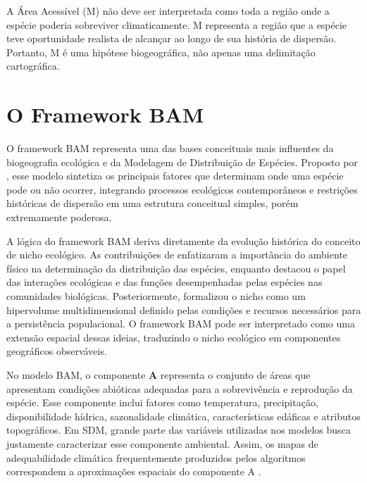 \begin{importantbox}
	A Área Acessível (M) não deve ser interpretada como toda a região onde a espécie poderia sobreviver climaticamente. M representa a região que a espécie teve oportunidade realista de alcançar ao longo de sua história de dispersão. Portanto, M é uma hipótese biogeográfica, não apenas uma delimitação cartográfica.
\end{importantbox}

\section{O Framework BAM}

O framework BAM representa uma das bases conceituais mais influentes da biogeografia ecológica e da Modelagem de Distribuição de Espécies. Proposto por \textcite{Soberon2007}, esse modelo sintetiza os principais fatores que determinam onde uma espécie pode ou não ocorrer, integrando processos ecológicos contemporâneos e restrições históricas de dispersão em uma estrutura conceitual simples, porém extremamente poderosa.

A lógica do framework BAM deriva diretamente da evolução histórica do conceito de nicho ecológico. As contribuições de \textcite{Grinnell1917} enfatizaram a importância do ambiente físico na determinação da distribuição das espécies, enquanto \textcite{Elton1927} destacou o papel das interações ecológicas e das funções desempenhadas pelas espécies nas comunidades biológicas. Posteriormente, \textcite{Hutchinson1957} formalizou o nicho como um hipervolume multidimensional definido pelas condições e recursos necessários para a persistência populacional. O framework BAM pode ser interpretado como uma extensão espacial dessas ideias, traduzindo o nicho ecológico em componentes geográficos observáveis.

No modelo BAM, o componente \textbf{A} representa o conjunto de áreas que apresentam condições abióticas adequadas para a sobrevivência e reprodução da espécie. Esse componente inclui fatores como temperatura, precipitação, disponibilidade hídrica, sazonalidade climática, características edáficas e atributos topográficos. Em SDM, grande parte das variáveis utilizadas nos modelos busca justamente caracterizar esse componente ambiental. Assim, os mapas de adequabilidade climática frequentemente produzidos pelos algoritmos correspondem a aproximações espaciais do componente A \parencite{Elith2009,Guisan2017}.

